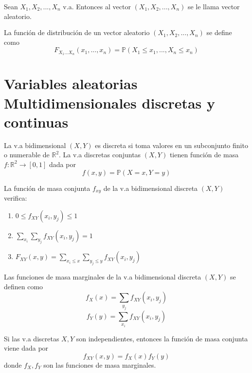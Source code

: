 \begin{defn}
Sean $X_1,X_2,...,X_n$ v.a. Entonces al vector $ (X_1,X_2,...,X_n)$ se le llama vector aleatorio. 
\end{defn}

\begin{defn}
La función de distribución de un vector aleatorio $ (X_1,X_2,...,X_n)$ se define como  \[ F_{X_1...X_n} (x_1,...,x_n) = \mathbb{P}(X_1\leq x_1,..., X_n\leq x_n) \]
\end{defn}

\section{Variables aleatorias Multidimensionales discretas y continuas}

\begin{defn}
La v.a bidimensional $(X,Y)$ es discreta si toma valores en un subconjunto finito o numerable de $\mathbb{R}^2$. La v.a discretas conjuntas $(X,Y)$ tienen función de masa $f:\mathbb{R}^2\rightarrow[0,1]$ dada por \[ f(x,y) = \mathbb{P}(X=x, Y=y) \]
\end{defn}

\begin{prop}
La función de masa conjunta $f_{xy}$ de la v.a bidimensional discreta $(X,Y)$ verifica:

\begin{enumerate}[label=(\roman*)]
    \item $0\leq f_{XY}(x_i,y_j) \leq 1$
    \item $\sum_{x_i}\sum_{y_j} f_{XY}(x_i,y_j) = 1$
    \item $F_{XY}(x,y) = \sum_{x_i \leq x}\sum_{y_j \leq y} f_{XY}(x_i,y_j)$
\end{enumerate}
\end{prop}

\begin{defn}
Las funciones de masa marginales de la v.a bidimensional discreta $(X,Y)$ se definen como \[ f_X(x) = \sum_{y_j} f_{XY}(x_i,y_j) \] \[  f_Y(y) = \sum_{x_i} f_{XY}(x_i,y_j) \]
\end{defn}

\begin{prop}
Si las v.a discretas $X,Y$ son independientes, entonces la función de masa conjunta viene dada por \[ f_{XY}(x,y)=f_{X}(x)f_{Y}(y) \] donde $f_{X}, f_{Y}$ son las funciones de masa marginales.
\end{prop}

